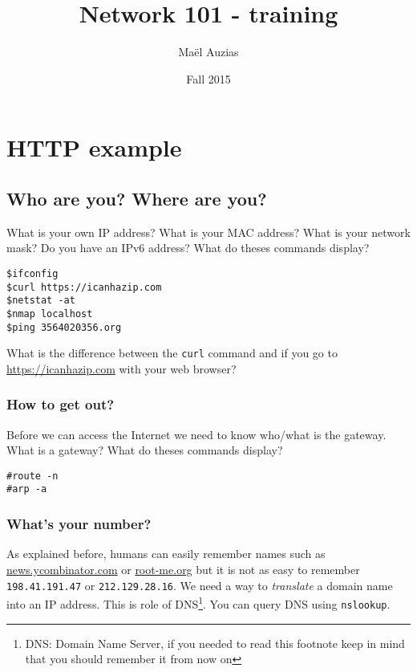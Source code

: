 \documentclass[11pt]{article}
\begin{document}
\title{Network 101 - training}
\date{Fall 2015}
\author{Maël Auzias}
\maketitle

\tableofcontents
\pagebreak


\section{HTTP example}
\subsection{Who are you? Where are you?}
What is your own IP address? What is your MAC address? What is your network mask? Do you have an IPv6 address?
What do theses commands display?
\begin{verbatim}
$ifconfig
$curl https://icanhazip.com
$netstat -at
$nmap localhost
$ping 3564020356.org
\end{verbatim}
What is the difference between the \verb"curl" command and if you go to \color{blue}\href{https://icanhazip.com}{https://icanhazip.com}\color{black} with your web browser?

\subsubsection{How to get out?}
Before we can access the Internet we need to know who/what is the gateway. What is a gateway?
What do theses commands display?
\begin{verbatim}
#route -n
#arp -a
\end{verbatim}

\subsubsection{What's your number?}
As explained before, humans can easily remember names such as \color{blue}\href{https://news.ycombinator.com}{news.ycombinator.com}\color{black} or \color{blue}\href{http://root-me.org}{root-me.org}\color{black} but it is not as easy to remember \verb"198.41.191.47" or \verb"212.129.28.16". We need a way to \emph{translate} a domain name into an IP address. This is role of DNS\footnote{DNS: Domain Name Server, if you needed to read this footnote keep in mind that you should remember it from now on}. You can query DNS using \verb"nslookup".
\end{document}
